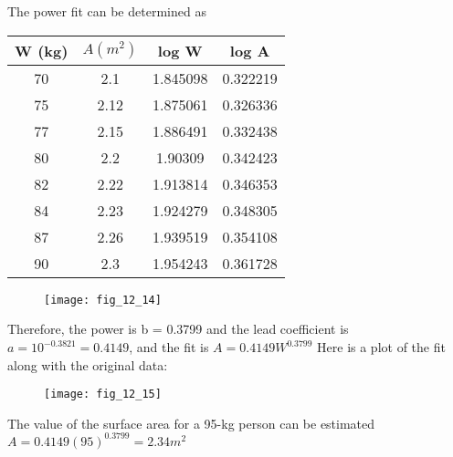 \documentclass[../main.tex]{subfiles}
\begin{document}
\section{}
The power fit can be determined as
\bigbreak
		\begin{tabular}{|c|c|c|c|}
		\hline W (kg)&$A(m^2)$&log W&log A\\ \hline
			70&2.1&1.845098&0.322219\\ \hline
			75&2.12&1.875061&0.326336\\ \hline
			77&2.15&1.886491&0.332438\\ \hline
			80&2.2&1.90309&0.342423\\ \hline
			82&2.22&1.913814&0.346353\\ \hline
			84&2.23&1.924279&0.348305\\ \hline
			87&2.26&1.939519&0.354108\\ \hline
			90&2.3&1.954243&0.361728\\ \hline
	\end{tabular}
	\bigbreak
	\begin{figure}[H]
		\texttt{[image: fig\_12\_14]}
		\label{fig:fig_12_14}
	\end{figure}
	\bigbreak
Therefore, the power is b = 0.3799 and the lead coefficient is $a=10^{-0.3821}=0.4149$, and the fit is
	\bigbreak
$A=0.4149W^{0.3799}$
	\bigbreak
Here is a plot of the fit along with the original data: 
	\bigbreak
	\begin{figure}[H]
		\texttt{[image: fig\_12\_15]}
		\label{fig:fig_12_15}
	\end{figure}
	\bigbreak
The value of the surface area for a 95-kg person can be estimated
	\bigbreak
$A=0.4149(95)^{0.3799}=2.34m^2$
	\bigbreak
\end{document}
